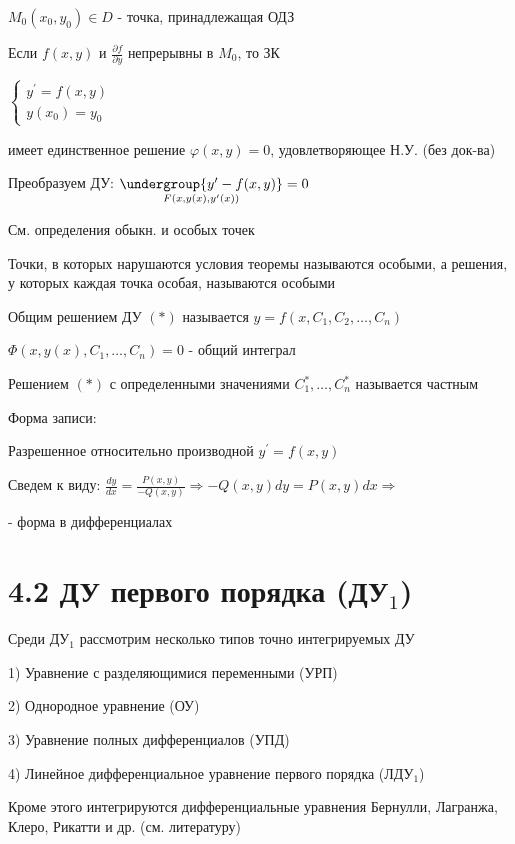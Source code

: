 \documentclass[12pt]{article}
\begin{document}
    $M_0(x_0, y_0) \in D$ - точка, принадлежащая ОДЗ

    Если $f(x, y)$ и $\frac{\partial f}{\partial y}$ непрерывны в $M_0$, то ЗК

    $\begin{cases}y^\prime = f(x, y) \\ y(x_0) = y_0\end{cases}$

    имеет единственное решение $\varphi(x, y) = 0$, удовлетворяющее Н.У. (без док-ва)

    \Nota Преобразуем ДУ: $\underset{F(x, y(x), y^\prime(x))}{\undergroup{y^\prime - f(x, y)}} = 0$

    См. определения обыкн. и особых точек

     Точки, в которых нарушаются условия теоремы называются особыми, а решения, у которых каждая точка особая,
    называются особыми

     Общим решением ДУ $(*)$ называется $y = f(x, C_1, C_2, \dots, C_n)$

    \Nota $\Phi(x, y(x), C_1, \dots, C_n) = 0$ - общий интеграл

     Решением $(*)$ с определенными значениями $C_1^*, \dots, C_n^*$ называется частным

    \Nota Форма записи:

    Разрешенное относительно производной $y^\prime = f(x, y)$

    Сведем к виду: $\frac{dy}{dx} = \frac{P(x, y)}{-Q(x, y)} \Longrightarrow -Q(x, y)dy = P(x, y)dx \Longrightarrow $

     - форма в дифференциалах



    \section{4.2 ДУ первого порядка (ДУ$_1$)}

    \Nota Среди ДУ$_1$ рассмотрим несколько типов точно интегрируемых ДУ

    1) Уравнение с разделяющимися переменными (УРП)

    2) Однородное уравнение (ОУ)

    3) Уравнение полных дифференциалов (УПД)

    4) Линейное дифференциальное уравнение первого порядка (ЛДУ$_1$)

    Кроме этого интегрируются дифференциальные уравнения Бернулли, Лагранжа, Клеро, Рикатти и др. (см. литературу)
\end{document}
